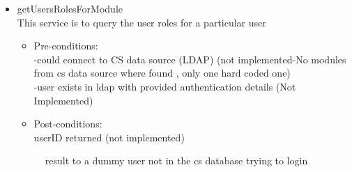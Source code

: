 \begin {itemize}
\item {getUsersRolesForModule}\\
This service is to query the user roles for a particular user\\
\begin {itemize}
\item Pre-conditions:\\
-could connect to CS data source (LDAP) (not implemented-No modules from cs data source where found , only one 			hard coded one)\\
        -user exists in ldap with provided authentication details (Not Implemented)\\
\item Post-conditions:\\
userID returned (not implemented)  
\end {itemize}
\begin{figure}[h!]
  \centering
  \caption{result to a dummy user not in the cs database trying to login }
\end{figure}
\end {itemize}
